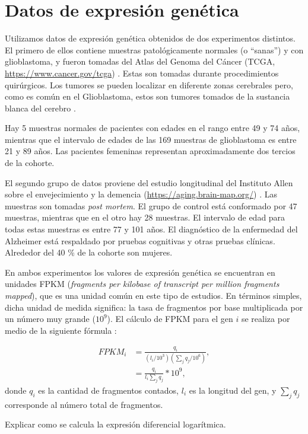 \section{Datos de expresión genética}
Utilizamos datos de expresión genética obtenidos de dos experimentos distintos. El primero de ellos contiene muestras patológicamente normales (o ``sanas'') y con glioblastoma, y fueron tomadas del Atlas del Genoma del Cáncer (TCGA, \href{https://www.cancer.gov/tcga}{https://www.cancer.gov/tcga}) \cite{Brennan_2013, Tomczak2015}. Estas son tomadas durante procedimientos quirúrgicos. Los tumores se pueden localizar en diferente zonas cerebrales pero, como es común en el Glioblastoma, estos son tumores tomados de la sustancia blanca del cerebro \cite{ellingson2013probabilistic}.

Hay 5 muestras normales de pacientes con edades en el rango entre 49 y 74 años, mientras que el intervalo de edades de las 169 muestras de glioblastoma es entre 21 y 89 años. Las pacientes femeninas representan aproximadamente dos tercios de la cohorte.

El segundo grupo de datos proviene del estudio longitudinal del Instituto Allen sobre el envejecimiento y la demencia (\href{https://aging.brain-map.org/}{https://aging.brain-map.org/}) \cite{Miller_2017}. Las muestras son tomadas \textit{post mortem}. El grupo de control está conformado por 47 muestras, mientras que en el otro hay 28 muestras. El intervalo de edad para todas estas muestras es entre 77 y 101 años. El diagnóstico de la enfermedad del Alzheimer está respaldado por pruebas cognitivas y otras pruebas clínicas. Alrededor del 40 \% de la cohorte son mujeres.

En ambos experimentos los valores de expresión genética se encuentran en unidades FPKM (\textit{fragments per kilobase of transcript per million fragments mapped}), que es una unidad común en este tipo de estudios. En términos simples, dicha unidad de medida significa: la tasa de fragmentos por base multiplicada por un número muy grande ($ 10^9 $). El cálculo de FPKM para el gen $ i $ se realiza por medio de la siguiente fórmula \cite{Zhao_2021}:

\begin{equation}
	\begin{split}
		FPKM_i &= \frac{q_i}{(l_i/10^3) (\sum_{j}q_j/10^6)} ,\\
		&= \frac{q_i}{l_i \sum_j q_j} * 10^9,
	\end{split}
\end{equation}
donde $ q_i $ es la cantidad de fragmentos contados, $ l_i $ es la longitud del gen, y $ \sum_j q_j $ corresponde al número total de fragmentos.

\alert{Explicar como se calcula la expresión diferencial logarítmica.}